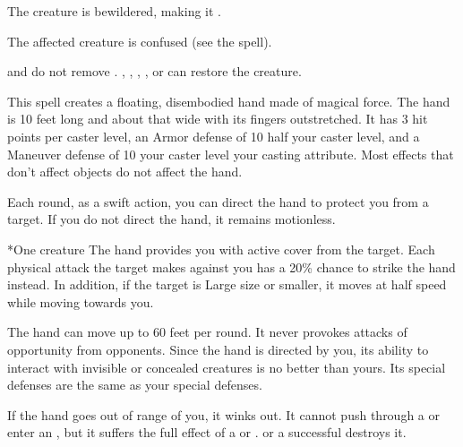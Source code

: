 \begin{spellhealthy}
    The creature is bewildered, making it \vulnerable.
\end{spellhealthy}
\begin{spellblood}
    \par The affected creature is confused (see the  spell).
\end{spellblood}
\spellnotes {} and  do not remove . , , , , or  can restore the creature.

\spellrng{\rngmed}
\spelldur{\durshort \dismissable}
\spellline
\spelleffect This spell creates a floating, disembodied hand made of magical force. The hand is 10 feet long and about that wide with its fingers outstretched. It has 3 hit points per caster level, an Armor defense of 10 \add half your caster level, and a Maneuver defense of 10 \add your caster level \add your casting attribute. Most effects that don't affect objects do not affect the hand.

Each round, as a swift action, you can direct the hand to protect you from a target. If you do not direct the hand, it remains motionless.
\begin{spelltarget}*{One creature}
    \spelleffect The hand provides you with active cover from the target. Each physical attack the target makes against you has a 20\% chance to strike the hand instead. In addition, if the target is Large size or smaller, it moves at half speed while moving towards you.
\end{spelltarget}
\spellnotes The hand can move up to 60 feet per round. It never provokes attacks of opportunity from opponents. Since the hand is directed by you, its ability to interact with invisible or concealed creatures is no better than yours. Its special defenses are the same as your special defenses.

If the hand goes out of range of you, it winks out. It cannot push through a  or enter an , but it suffers the full effect of a  or .  or a successful  destroys it.

